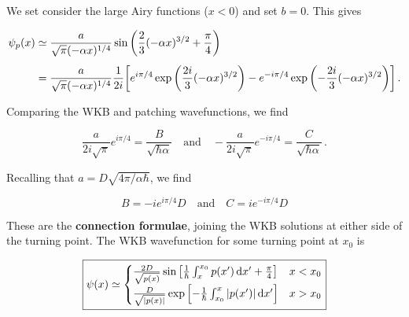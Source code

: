\documentclass[12pt, titlepage]{article}
\begin{document}
We set consider the large Airy functions ($x<0$) and set $b=0$. This gives

\begin{align}
	\psi_p(x)&\simeq\frac{a}{\sqrt{\pi}(-\alpha x)^{1/4}}\sin\qty(\frac{2}{3}(-\alpha x)^{3/2} + \frac{\pi}{4}) \nonumber \\[4pt]  &= \frac{a}{\sqrt{\pi}(-\alpha x)^{1/4}}\frac{1}{2i}\qty[e^{i\pi/4}\exp\qty(\frac{2i}{3}(-\alpha x)^{3/2}) - e^{-i\pi/4}\exp\qty(-\frac{2i}{3}(-\alpha x)^{3/2})] \,.
\end{align}

Comparing the WKB and patching wavefunctions, we find

\begin{equation}
	\frac{a}{2i\sqrt{\pi}}e^{i\pi/4} = \frac{B}{\sqrt{\hbar\alpha}} \quad\text{and}\quad -\frac{a}{2i\sqrt{\pi}}e^{-i\pi/4} = \frac{C}{\sqrt{\hbar\alpha}} \,.
\end{equation}

Recalling that $a = D\sqrt{4\pi/\alpha\hbar}$, we find

\begin{equation}
	\boxed{ B = -ie^{i\pi/4}D \quad\text{and}\quad C = ie^{-i\pi/4}D }
\end{equation}

These are the \textbf{connection formulae}, joining the WKB solutions at either side of the turning point. The WKB wavefunction for some turning point at $x_0$ is

\begin{equation}
	\boxed{\psi(x)\simeq \begin{cases}
	\frac{2D}{\sqrt{p(x)}}\sin\qty[\frac{1}{\hbar}\int_{x}^{x_0}p(x^\prime) \dd{x^\prime} + \frac{\pi}{4}] & x < x_0 \\
	\frac{D}{\sqrt{|p(x)|}}\exp\qty[-\frac{1}{\hbar}\int_{x_0}^{x}|p(x^\prime)|\dd{x^\prime}] & x>x_0
	\end{cases}}
\end{equation} 
\end{document}
